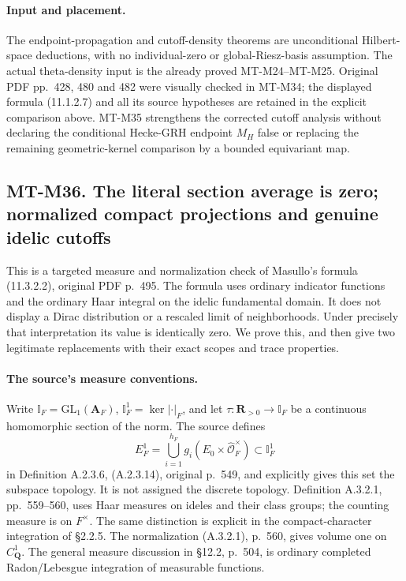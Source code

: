 \paragraph{Input and placement.}
The endpoint-propagation and cutoff-density theorems
are unconditional Hilbert-space deductions, with no
individual-zero or global-Riesz-basis assumption.
The actual theta-density input is the already proved
MT-M24--MT-M25.  Original PDF pp.~428, 480 and 482
were visually checked in MT-M34; the displayed formula
(11.1.2.7) and all its source hypotheses are retained
in the explicit comparison above.  MT-M35 strengthens
the corrected cutoff analysis without declaring the
conditional Hecke-GRH endpoint $M_H$ false or replacing
the remaining geometric-kernel comparison by a bounded
equivariant map.

\subsection*{MT-M36. The literal section average is zero;
normalized compact projections and genuine idelic cutoffs}

This is a targeted measure and normalization check of
Masullo's formula (11.3.2.2), original PDF p.~495.
The formula uses ordinary indicator functions and the
ordinary Haar integral on the idelic fundamental domain.
It does not display a Dirac distribution or a rescaled
limit of neighborhoods.  Under precisely that
interpretation its value is identically zero.
We prove this, and then give two legitimate replacements
with their exact scopes and trace properties.

\paragraph{The source's measure conventions.}
Write $\mathbb I_F=\mathrm{GL}_1(\mathbf A_F)$,
$\mathbb I_F^1=\ker|\cdot|_F$, and let
$\tau:\mathbf R_{>0}\to\mathbb I_F$ be a continuous
homomorphic section of the norm.  The source defines
\[
 E_F^1=\bigcup_{i=1}^{h_F}
              g_i(E_0\times\widehat{\mathcal O}_F^\times)
                         \subset\mathbb I_F^1
 \tag{M36.1}
\]
in Definition A.2.3.6, (A.2.3.14), original p.~549,
and explicitly gives this set the subspace topology.
It is not assigned the discrete topology.  Definition
A.3.2.1, pp.~559--560, uses Haar measures on ideles
and their class groups; the counting measure is on
$F^\times$.  The same distinction is explicit in
the compact-character integration of \S2.2.5.
The normalization (A.3.2.1), p.~560, gives volume one
on $C_{\mathbf Q}^1$.  The general measure discussion
in \S12.2, p.~504, is ordinary completed Radon/Lebesgue
integration of measurable functions.

